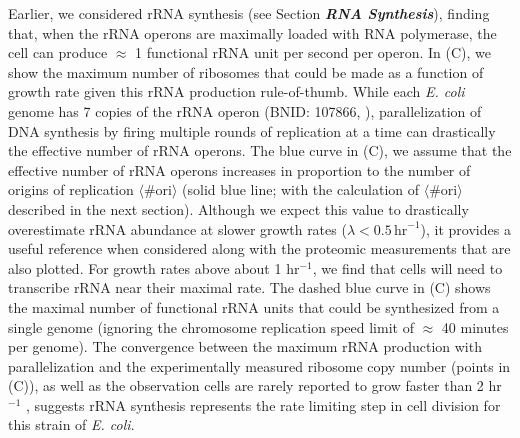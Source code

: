 
Earlier, we considered rRNA synthesis (see Section \textit{\bf RNA
Synthesis}), finding that, when the rRNA operons are maximally loaded with
RNA polymerase, the cell can produce $\approx$ 1 functional rRNA unit per
second per operon. In (C), we show the maximum number of
ribosomes that could be made as a function of growth rate given this rRNA
production rule-of-thumb. While each \textit{E. coli} genome has 7 copies of
the rRNA operon (BNID: 107866, \cite{milo2010}), parallelization of DNA
synthesis by firing multiple rounds of replication at a time can drastically
the effective number of rRNA operons. The blue curve in
(C), we assume that the effective number of rRNA operons
increases in proportion to the number of origins of replication
$\langle\text{\# ori}\rangle$ (solid blue line; with the calculation of
$\langle\text{\# ori}\rangle$ described in the next section). Although we
expect this value to drastically overestimate rRNA abundance at slower growth
rates ($\lambda < 0.5\, \text{hr}^{-1}$), it provides a useful reference when
considered along with the proteomic measurements that are also plotted. For
growth rates above about 1 hr$^{-1}$, we find that cells will need to
transcribe rRNA near their maximal rate.  The dashed blue curve in
(C) shows the maximal number of functional rRNA units that
could be synthesized from a single genome (ignoring the chromosome replication
speed limit of $\approx$ 40 minutes per genome). The convergence between the maximum
rRNA production with parallelization and the experimentally measured ribosome
copy number (points in (C)), as well as the observation
cells are rarely reported to grow faster than 2 hr$^{-1}$ \citep{bremer2008}, suggests rRNA
synthesis represents the rate limiting step in cell division for this strain
of \textit{E. coli}.
